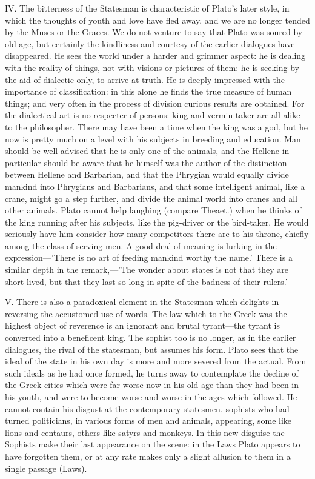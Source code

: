 \documentclass[11pt,letter]{article}
\begin{document}
\par  IV. The bitterness of the Statesman is characteristic of Plato's later style, in which the thoughts of youth and love have fled away, and we are no longer tended by the Muses or the Graces. We do not venture to say that Plato was soured by old age, but certainly the kindliness and courtesy of the earlier dialogues have disappeared. He sees the world under a harder and grimmer aspect: he is dealing with the reality of things, not with visions or pictures of them: he is seeking by the aid of dialectic only, to arrive at truth. He is deeply impressed with the importance of classification: in this alone he finds the true measure of human things; and very often in the process of division curious results are obtained. For the dialectical art is no respecter of persons: king and vermin-taker are all alike to the philosopher. There may have been a time when the king was a god, but he now is pretty much on a level with his subjects in breeding and education. Man should be well advised that he is only one of the animals, and the Hellene in particular should be aware that he himself was the author of the distinction between Hellene and Barbarian, and that the Phrygian would equally divide mankind into Phrygians and Barbarians, and that some intelligent animal, like a crane, might go a step further, and divide the animal world into cranes and all other animals. Plato cannot help laughing (compare Theaet.) when he thinks of the king running after his subjects, like the pig-driver or the bird-taker. He would seriously have him consider how many competitors there are to his throne, chiefly among the class of serving-men. A good deal of meaning is lurking in the expression—'There is no art of feeding mankind worthy the name.' There is a similar depth in the remark,—'The wonder about states is not that they are short-lived, but that they last so long in spite of the badness of their rulers.'

\par  V. There is also a paradoxical element in the Statesman which delights in reversing the accustomed use of words. The law which to the Greek was the highest object of reverence is an ignorant and brutal tyrant—the tyrant is converted into a beneficent king. The sophist too is no longer, as in the earlier dialogues, the rival of the statesman, but assumes his form. Plato sees that the ideal of the state in his own day is more and more severed from the actual. From such ideals as he had once formed, he turns away to contemplate the decline of the Greek cities which were far worse now in his old age than they had been in his youth, and were to become worse and worse in the ages which followed. He cannot contain his disgust at the contemporary statesmen, sophists who had turned politicians, in various forms of men and animals, appearing, some like lions and centaurs, others like satyrs and monkeys. In this new disguise the Sophists make their last appearance on the scene: in the Laws Plato appears to have forgotten them, or at any rate makes only a slight allusion to them in a single passage (Laws).
\end{document}
